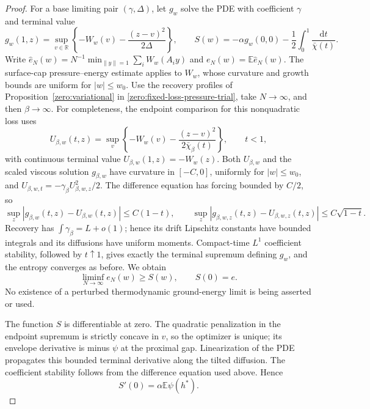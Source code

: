 \documentclass[11pt,a4paper]{article}
\numberwithin{equation}{section}
\theoremstyle{definition}
\theoremstyle{remark}
\newcommand{\E}{\mathbb E}
\newcommand{\R}{\mathbb R}
\newcommand{\dd}{\mathrm d}
\begin{document}
\begin{proof}
For a base limiting pair \((\gamma,\Delta)\), let \(g_w\) solve the
PDE with coefficient \(\gamma\) and terminal value
\[
 g_w(1,z)=\sup_{v\in\R}
 \left\{-W_w(v)-\frac{(z-v)^2}{2\Delta}\right\},
 \qquad
 S(w)=-\alpha g_w(0,0)-\frac12\int_0^1\frac{\dd t}{\bar\chi(t)}.
\]
Write \(\widehat e_N(w)=N^{-1}\min_{\|y\|=1}\sum_iW_w(A_i y)\)
and \(e_N(w)=\E\widehat e_N(w)\).
The surface-cap pressure--energy estimate applies to \(W_w\), whose
curvature and growth bounds are uniform for \(|w|\le w_0\).
Use the recovery profiles of Proposition~\ref{zero:variational} in
\eqref{zero:fixed-loss-pressure-trial}, take \(N\to\infty\), and
then \(\beta\to\infty\).  For completeness, the endpoint comparison
for this nonquadratic loss uses
\[
 U_{\beta,w}(t,z)=\sup_v\left\{-W_w(v)
               -\frac{(z-v)^2}{2\bar\chi_\beta(t)}\right\},\qquad t<1,
\]
with continuous terminal value $U_{\beta,w}(1,z)=-W_w(z)$.
Both \(U_{\beta,w}\) and the scaled viscous solution
\(g_{\beta,w}\) have curvature in \([-C,0]\), uniformly for
\(|w|\le w_0\), and \(U_{\beta,w,t}=-\gamma_\beta U_{\beta,w,z}^2/2\).
The difference equation has forcing bounded by \(C/2\), so
\[
 \sup_z|g_{\beta,w}(t,z)-U_{\beta,w}(t,z)|\le C(1-t),\qquad
 \sup_z|g_{\beta,w,z}(t,z)-U_{\beta,w,z}(t,z)|\le C\sqrt{1-t}.
\]
Recovery has \(\int\gamma_\beta=L+o(1)\); hence its drift Lipschitz
constants have bounded integrals and its diffusions have uniform
moments.  Compact-time \(L^1\) coefficient stability, followed by
\(t\uparrow1\), gives exactly the terminal supremum defining
\(g_w\), and the entropy converges as before.  We obtain
\begin{equation}\label{zero:fixed-loss-support}
 \liminf_{N\to\infty}e_N(w)\ge S(w),\qquad S(0)=e.
\end{equation}
No existence of a perturbed thermodynamic ground-energy limit is
being asserted or used.

The function \(S\) is differentiable at zero.  The quadratic
penalization in the endpoint supremum is strictly concave in \(v\),
so the optimizer is unique; its envelope derivative is minus
\(\psi\) at the proximal gap.  Linearization of the PDE propagates
this bounded terminal derivative along the tilted diffusion.
The coefficient stability follows from the difference equation
used above.  Hence
\begin{equation}\label{zero:fixed-loss-derivative}
 S'(0)=\alpha\E\psi(h^*).
\end{equation}


\end{proof}
\end{document}
